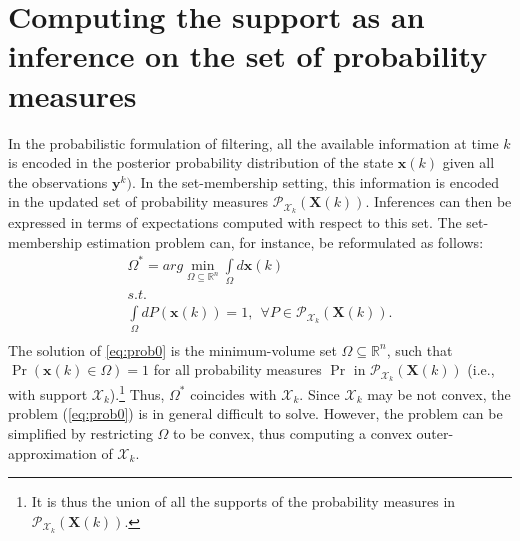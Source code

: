 \documentclass[twocolumn]{autart}
\newcommand{\DP}[1]{{#1}}
\begin{document}
\section{Computing the support as an inference on the set of probability measures}
\label{sec:computingmeans}
 In the probabilistic formulation of filtering, all the available information at time $k$ is encoded
 in the  posterior probability distribution of the state $\mathbf{x}(k)$ given all the observations $\mathbf{y}^k)$.
 In the set-membership setting, this information is encoded in the updated set of probability measures $\mathcal{P}_{\mathcal{X}_k}(\mathbf{X}(k))$.
 Inferences can then be expressed in terms of expectations computed \DP{with respect to}  this set.
 The set-membership estimation problem  can, for instance, \DP{be reformulated} as follows:
\begin{equation}
\label{eq:prob0}
 \begin{array}{l}
\Omega^*=arg\min\limits_{\Omega \subseteq \mathbb{R}^n} \int\limits_{\Omega} d\mathbf{x}(k)  \\
s.t.\\
 \int\limits_{\Omega} dP(\mathbf{x}(k))= 1, \ \ \forall  P\in \mathcal{P}_{\mathcal{X}_k}(\mathbf{X}(k)).\\
\end{array}
 \end{equation}
 The solution of \eqref{eq:prob0} is the minimum-volume set  $\Omega \subseteq \mathbb{R}^n$, such that
$\Pr(\mathbf{x}(k) \in \Omega)=1$ for all probability measures $\Pr$ in $\mathcal{P}_{\mathcal{X}_k}(\mathbf{X}(k))$ (i.e., with support $\mathcal{X}_k$).\footnote{It is thus the union of all the supports of the probability measures in  $\mathcal{P}_{\mathcal{X}_k}(\mathbf{X}(k))$.} Thus, $\Omega^*$ coincides with $\mathcal{X}_k$.
Since $\mathcal{X}_k$ may be not convex, the problem (\ref{eq:prob0}) is in general difficult to solve.
However, the problem can be simplified  by restricting $\Omega$
to be convex, thus computing  a convex outer-approximation  of $\mathcal{X}_k$.
\end{document}
